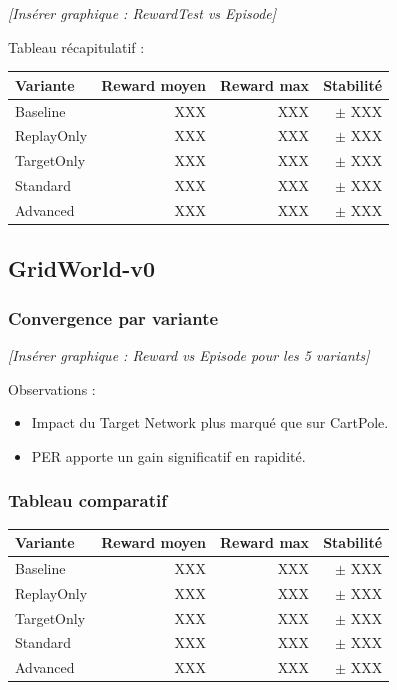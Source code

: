 \documentclass[12pt,a4paper]{article}
\begin{document}
\textit{[Insérer graphique : RewardTest vs Episode]}

Tableau récapitulatif :

\begin{center}
\begin{tabular}{|l|r|r|r|}
\hline
\textbf{Variante} & \textbf{Reward moyen} & \textbf{Reward max} & \textbf{Stabilité} \\
\hline
Baseline & XXX & XXX & $\pm$ XXX \\
ReplayOnly & XXX & XXX & $\pm$ XXX \\
TargetOnly & XXX & XXX & $\pm$ XXX \\
Standard & XXX & XXX & $\pm$ XXX \\
Advanced & XXX & XXX & $\pm$ XXX \\
\hline
\end{tabular}
\end{center}

\subsection{GridWorld-v0}

\subsubsection{Convergence par variante}

\textit{[Insérer graphique : Reward vs Episode pour les 5 variants]}

Observations :
\begin{itemize}
    \item Impact du Target Network plus marqué que sur CartPole.
    \item PER apporte un gain significatif en rapidité.
\end{itemize}

\subsubsection{Tableau comparatif}

\begin{center}
\begin{tabular}{|l|r|r|r|}
\hline
\textbf{Variante} & \textbf{Reward moyen} & \textbf{Reward max} & \textbf{Stabilité} \\
\hline
Baseline & XXX & XXX & $\pm$ XXX \\
ReplayOnly & XXX & XXX & $\pm$ XXX \\
TargetOnly & XXX & XXX & $\pm$ XXX \\
Standard & XXX & XXX & $\pm$ XXX \\
Advanced & XXX & XXX & $\pm$ XXX \\
\hline
\end{tabular}
\end{center}
\end{document}
